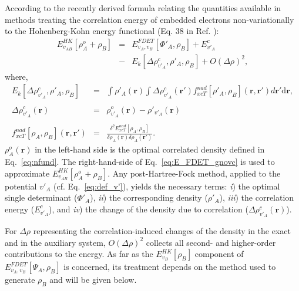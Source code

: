 \documentclass[amsmath,amssymb,preprint,aip,jcp]{revtex4-1}
\begin{document}
According to the recently derived formula relating the quantities available in methods treating the correlation energy of embedded electrons non-variationally to the Hohenberg-Kohn energy functional (Eq. 38 in Ref. ): 
\begin{eqnarray} \label{eq:E_FDET_gnovc}
 E_{v_{AB}}^{HK}[\rho_A^{o}+\rho_B] &=& E_{v_{A},{v_B}}^{FDET}[\Phi'_{A},\rho_B] + E^{c}_{v'_A} 
 \\ \nonumber
 &-& E_k[\Delta \rho^{c}_{v'_A}, \rho'_A, \rho_B] + O(\Delta\rho)^2, 
 \end{eqnarray}
where,
\begin{eqnarray}
\label{eq:nkernel}
 E_k[\Delta \rho^{c}_{v'_A}, \rho'_A, \rho_B] &=&
 \int \rho'_A(\mathbf{r}) \int \Delta \rho^{c}_{v'_A}(\mathbf{r'}) f^{nad}_{xcT}[\rho'_A, \rho_B](\mathbf{r},\mathbf{r'})d\mathbf{r'}\mathrm{d}\mathbf{r},\\
 \nonumber \\ \label{eq:def_corrdens}
 \Delta \rho^{c}_{v'_A}(\mathbf{r})&=&\rho^{o}_{v'_A}(\mathbf{r})-\rho'_{v'_A}(\mathbf{r})\\
 \nonumber \\
 \label{eq:nf_nad}
 f^{nad}_{xcT}[\rho_A, \rho_B](\mathbf{r},\mathbf{r'}) &=& \frac{\delta^2 E^{nad}_{xcT}[\rho_A, \rho_B]}{\delta \rho_A(\mathbf{r}) \delta \rho_A(\mathbf{r'})}.
\end{eqnarray}
$\rho_A^{o}(\mathbf{r})$ in the left-hand side is the optimal correlated density defined in Eq.~\ref{eq:nfund}. 
The right-hand-side of Eq.~\ref{eq:E_FDET_gnovc} is used to approximate $E_{v_{AB}}^{HK}[\rho_A^{o}+\rho_B]$.
Any post-Hartree-Fock method, applied to the potential $v'_A$ (cf. Eq.~\ref{eq:def_v'}), yields the necessary terms: {\it i})
the optimal single determinant ($\Phi'_{A}$), {\it ii}) the corresponding density ($\rho'_{A}$), 
{\it iii}) the correlation energy ($E^{c}_{v'_A}$), and {\it iv}) the change of the density due to correlation ($\Delta \rho^{c}_{v'_A}(\mathbf{r})$). 

For $\Delta\rho$ representing the correlation-induced changes of the density in the exact and in the auxiliary system, 
 $O(\Delta\rho)^2$ collects all second- and higher-order contributions to the energy. 
As far as the $E^{HK}_{v_B}[\rho_B]$ component of ${ E}_{v_A,v_B}^{FDET}[\Psi_{A},\rho_B]$ is concerned,
its treatment depends on the method used to generate $\rho_B$ and will be given below.
\end{document}
